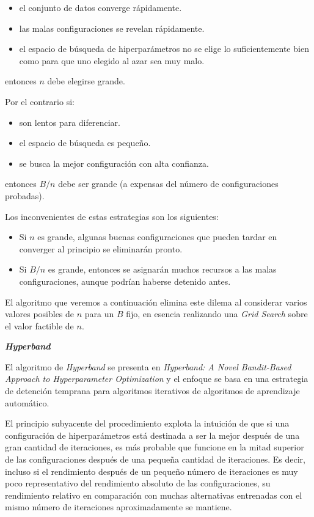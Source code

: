 \documentclass[a4paper,12pt]{article}
\begin{document}
\begin{itemize}[noitemsep, topsep=2pt]
	\item el conjunto de datos converge rápidamente.
	\item las malas configuraciones se revelan rápidamente.
	\item el espacio de búsqueda de hiperparámetros no se elige lo suficientemente bien como para que uno elegido al azar sea muy malo.
\end{itemize}
entonces $n$ debe elegirse grande.

\bigskip
Por el contrario si:
\begin{itemize}[noitemsep, topsep=2pt]
	\item son lentos para diferenciar.
	\item el espacio de búsqueda es pequeño.
	\item se busca la mejor configuración con alta confianza.
\end{itemize}
entonces $B/n$ debe ser grande (a expensas del número de configuraciones probadas).

\bigskip
Los inconvenientes de estas estrategias son los siguientes:
\begin{itemize}[noitemsep, topsep=2pt]
	\item Si $n$ es grande, algunas buenas configuraciones que pueden tardar en converger al principio se eliminarán pronto.
	\item Si $B/n$ es grande, entonces se asignarán muchos recursos a las malas configuraciones, aunque podrían haberse detenido antes.
\end{itemize}

El algoritmo que veremos a continuación elimina este dilema al considerar varios valores posibles de $n$ para un $B$ fijo, en esencia realizando una \textit{Grid Search} sobre el valor factible de $n$.

\clearpage

\textbf{\textit{Hyperband}} \label{hyperband}

El algoritmo de \textit{Hyperband} se presenta en \textit{ Hyperband: A Novel Bandit-Based Approach to Hyperparameter Optimization} \citep{li2018hyperband} y el enfoque se basa en una estrategia de detención temprana para algoritmos iterativos de algoritmos de aprendizaje automático.

El principio subyacente del procedimiento explota la intuición de que si una configuración de hiperparámetros está destinada a ser la mejor después de una gran cantidad de iteraciones, es más probable que funcione en la mitad superior de las configuraciones después de una pequeña cantidad de iteraciones. Es decir, incluso si el rendimiento después de un pequeño número de iteraciones es muy poco representativo del rendimiento absoluto de las configuraciones, su rendimiento relativo en comparación con muchas alternativas entrenadas con el mismo número de iteraciones aproximadamente se mantiene.
\end{document}

